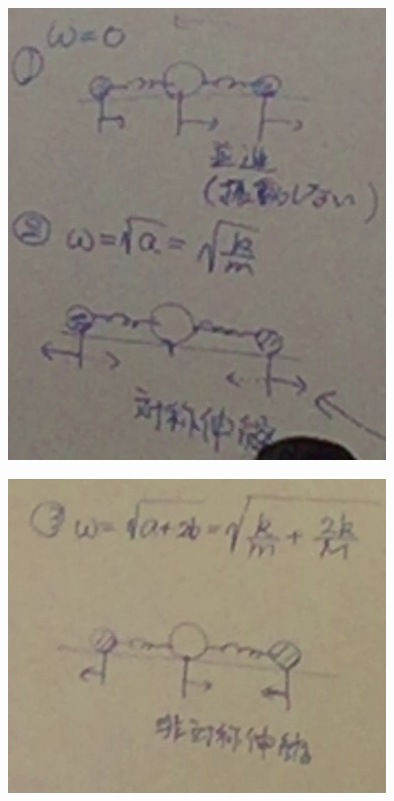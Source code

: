 \documentclass{jsarticle}
\begin{document}
\begin{center}
	\includegraphics[width=10cm]{11_27_3.JPG}
\end{center}
\begin{center}
	\includegraphics[width=10cm]{11_27_4.JPG}
\end{center}
\end{document}
